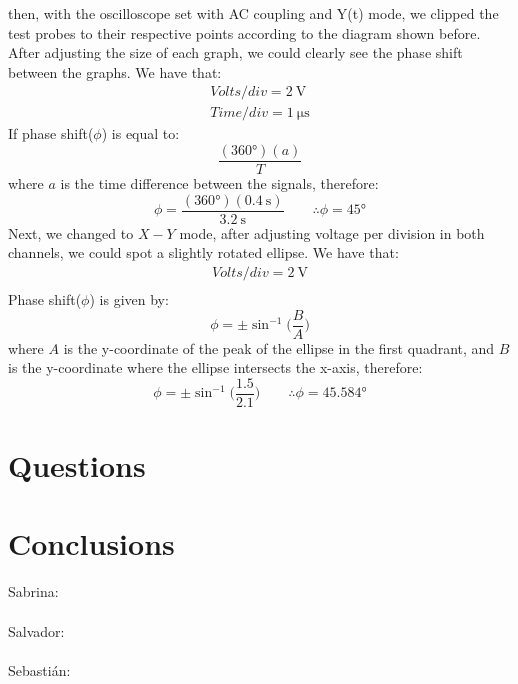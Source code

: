 \documentclass[a4paper]{article}
\begin{document}
then, with the oscilloscope set with AC coupling and Y(t) mode, we clipped the test probes to
their respective points according to the diagram shown before. After adjusting the size of each
graph, we could clearly see the phase shift between the graphs.
We have that:
\begin{gather*}
    Volts/div = \SI{2}{\volt}\\
    Time/div = \SI{1}{\micro\second}
\end{gather*}
If phase shift($\phi$) is equal to:
\[\frac{(\ang{360})(a)}{T}\]
where $a$ is the time difference between the signals, therefore:
\[\phi=\frac{(\ang{360})(\SI{0.4}{\second})}{\SI{3.2}{\second}}\qquad\therefore\phi=\ang{45}\]
Next, we changed to $X-Y$
mode, after adjusting voltage per division in both channels, we could spot a slightly rotated ellipse.
We have that:
\begin{gather*}
    Volts/div = \SI{2}{\volt}\\
\end{gather*}
Phase shift($\phi$) is given by:
\[\phi=\pm\sin^{-1}\Big(\frac{B}{A}\Big)\]
where $A$ is the y-coordinate of the peak of the ellipse in the first quadrant, and $B$ is the
y-coordinate where the ellipse intersects the x-axis, therefore:
\[\phi=\pm\sin^{-1}\Big(\frac{1.5}{2.1}\Big)\qquad\therefore\phi=\ang{45.584}\]
\section{Questions}
\section{Conclusions}
{\large Sabrina:}\\
\\[2ex]
{\large Salvador:}\\
\\[2ex]
{\large Sebastián:}\\
\end{document}
